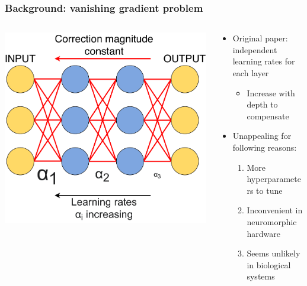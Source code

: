 \documentclass[pdf]{beamer}
\begin{document}
\begin{frame}
\frametitle{Background: vanishing gradient problem}
\begin{columns}
	\begin{column}{.5\textwidth}
		\includegraphics[width=\textwidth]{figures/perlayer_illustration.pdf}
	\end{column}
	\begin{column}{.5\textwidth}
		\begin{itemize}
			\item<1-> Original paper: independent learning rates for each layer
			\begin{itemize}
				\item<2-> Increase with depth to compensate
			\end{itemize}
			\item<3-> Unappealing for following reasons:
			\begin{enumerate}
				\item<4-> More hyperparameters to tune
				\item<5-> Inconvenient in neuromorphic hardware
				\item<6-> Seems unlikely in biological systems
			\end{enumerate}
		\end{itemize}
	\end{column}
\end{columns}
\end{frame}
\end{document}
